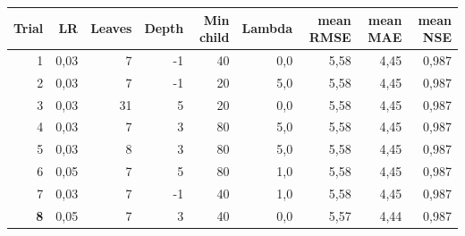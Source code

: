 \begin{tabular}{rrrrrrrrr}
\toprule
Trial & LR & Leaves & Depth & Min child & Lambda & mean RMSE & mean MAE & mean NSE \\
\midrule
1 & 0{,}03 & 7 & -1 & 40 & 0{,}0 & 5{,}58 & 4{,}45 & 0{,}987 \\
2 & 0{,}03 & 7 & -1 & 20 & 5{,}0 & 5{,}58 & 4{,}45 & 0{,}987 \\
3 & 0{,}03 & 31 & 5 & 20 & 0{,}0 & 5{,}58 & 4{,}45 & 0{,}987 \\
4 & 0{,}03 & 7 & 3 & 80 & 5{,}0 & 5{,}58 & 4{,}45 & 0{,}987 \\
5 & 0{,}03 & 8 & 3 & 80 & 5{,}0 & 5{,}58 & 4{,}45 & 0{,}987 \\
6 & 0{,}05 & 7 & 5 & 80 & 1{,}0 & 5{,}58 & 4{,}45 & 0{,}987 \\
7 & 0{,}03 & 7 & -1 & 40 & 1{,}0 & 5{,}58 & 4{,}45 & 0{,}987 \\
\textbf{8} & 0{,}05 & 7 & 3 & 40 & 0{,}0 & 5{,}57 & 4{,}44 & 0{,}987 \\
\bottomrule
\end{tabular}
